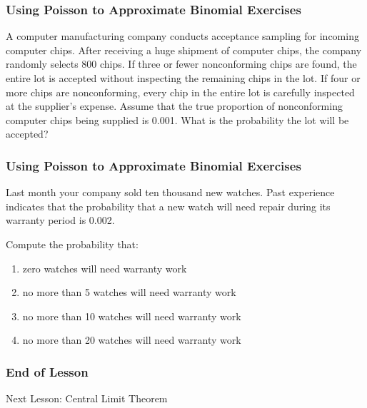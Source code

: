 \documentclass[xcolor=dvipsnames]{beamer}
\begin{document}
\begin{frame}
  \frametitle{Using Poisson to Approximate Binomial Exercises}
  {\ubung} A computer manufacturing company conducts acceptance
  sampling for incoming computer chips. After receiving a huge
  shipment of computer chips, the company randomly selects 800 chips.
  If three or fewer nonconforming chips are found, the entire lot is
  accepted without inspecting the remaining chips in the lot. If four
  or more chips are nonconforming, every chip in the entire lot is
  carefully inspected at the supplier's expense. Assume that the true
  proportion of nonconforming computer chips being supplied is 0.001.
  What is the probability the lot will be accepted?
\end{frame}

\begin{frame}
  \frametitle{Using Poisson to Approximate Binomial Exercises}
  {\ubung} Last month your company sold ten thousand new watches. Past
experience indicates that the probability that a new watch
will  need  repair  during  its  warranty  period  is  0.002.

Compute the probability that:
\begin{enumerate}
\item zero watches will need warranty work
\item no more than 5 watches will need warranty work
\item no more than 10 watches will need warranty work
\item no more than 20 watches will need warranty work
\end{enumerate}
\end{frame}

\begin{frame}
  \frametitle{End of Lesson}
Next Lesson: Central Limit Theorem
\end{frame}
\end{document}
